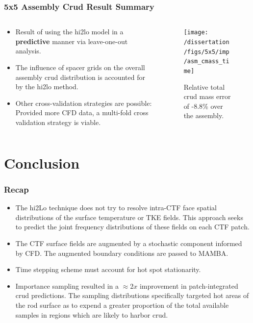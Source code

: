 \documentclass[t, pdftex]{beamer}
\begin{document}
\begin{frame}
\frametitle{5x5 Assembly Crud Result Summary}
\vspace{-18pt}
\begin{columns}
    \begin{column}{0.5\textwidth}
        \begin{itemize}
            \item Result of using the hi2lo model in a \textbf{predictive} manner via leave-one-out analysis.  
            \item The influence of spacer grids on the overall assembly crud distribution is accounted for by the hi2lo method.   
            \item Other cross-validation strategies are possible: Provided more CFD data, a multi-fold cross validation strategy is viable.
        \end{itemize}
    \end{column}
    \begin{column}{0.5\textwidth}
        \begin{figure}[H]%
            \texttt{[image: /dissertation/figs/5x5/imp/asm\_cmass\_time]}
            \caption{\centering Relative total crud mass error of -8.8\% over the assembly.}
        \end{figure}       
    \end{column}
\end{columns}
\end{frame}


\section{Conclusion}
\begin{frame}
\frametitle{Recap}
\vspace{-16pt}
\begin{itemize}
\item The hi2Lo technique does not try to resolve intra-CTF face spatial distributions
of the surface temperature or TKE fields.  This approach seeks to predict the joint frequency distributions of these fields on each CTF patch.
\item The CTF surface fields are augmented by a stochastic component informed by CFD.  The augmented boundary conditions are passed to MAMBA.
\item Time stepping scheme must account for hot spot stationarity.
\item Importance sampling resulted in a $\approx 2x$ improvement in patch-integrated crud predictions.  The sampling distributions specifically targeted hot areas of the rod surface as to expend a greater proportion of the total available samples in regions which are likely to harbor crud.
\end{itemize}
\end{frame}
\end{document}
